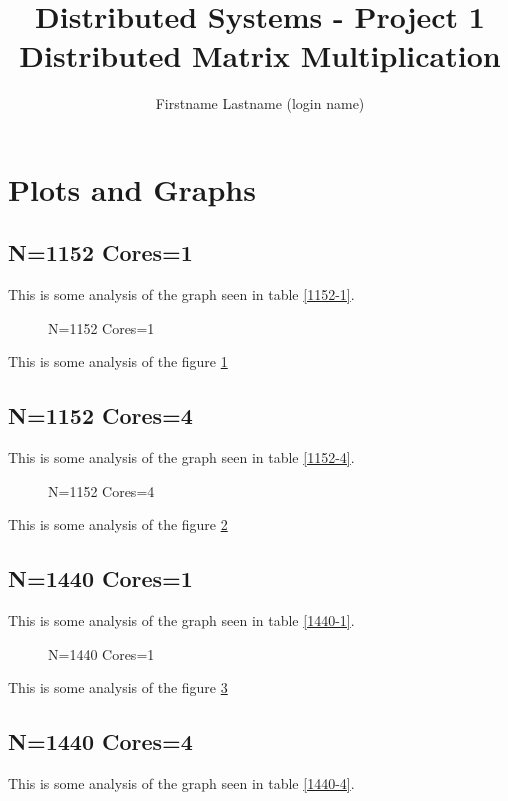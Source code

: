 \documentclass[a4paper]{article}
\title{Distributed Systems - Project 1 \\ Distributed Matrix Multiplication}
\author{Firstname Lastname (login name)}
\begin{document}
\maketitle

\section{Plots and Graphs}

\subsection{N=1152 Cores=1}

This is some analysis of the graph seen in table \ref{1152-1}.

\begin{figure}
    
    \caption{N=1152 Cores=1}
    \label{fig:1152_1}
\end{figure}

This is some analysis of the figure \ref{fig:1152_1}

\subsection{N=1152 Cores=4}

This is some analysis of the graph seen in table \ref{1152-4}.

\begin{figure}
    
    \caption{N=1152 Cores=4}
    \label{fig:1152_4}
\end{figure}

This is some analysis of the figure \ref{fig:1152_4}

\subsection{N=1440 Cores=1}

This is some analysis of the graph seen in table \ref{1440-1}.

\begin{figure}
    
    \caption{N=1440 Cores=1}
    \label{fig:1440_1}
\end{figure}

This is some analysis of the figure \ref{fig:1440_1}

\subsection{N=1440 Cores=4}

This is some analysis of the graph seen in table \ref{1440-4}.
\end{document}
